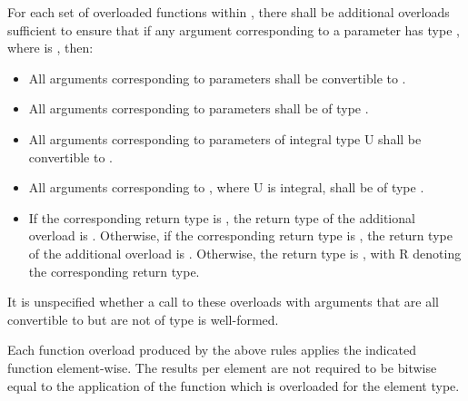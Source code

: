 \pnum \label{cl:cmath-spec} For each set of overloaded functions within , there shall be additional overloads sufficient to ensure that if any argument corresponding to a \double parameter has type \simd[<T, Abi>], where  is \true, then:
\begin{itemize}
  \item All arguments corresponding to \double parameters shall be convertible to \simd[<T, Abi>].

  \item All arguments corresponding to  parameters shall be of type \simd[<T, Abi>*].

  \item All arguments corresponding to parameters of integral type \type U shall be convertible to .

  \item All arguments corresponding to , where \type U is integral, shall be of type .

  \item If the corresponding return type is \double, the return type of the additional overload is \simd[<T, Abi>].
    Otherwise, if the corresponding return type is \bool, the return type of the additional overload is \mask[<T, Abi>].
    Otherwise, the return type is , with \type R denoting the corresponding return type.
\end{itemize}
It is unspecified whether a call to these overloads with arguments that are all convertible to \simd[<T, Abi>] but are not of type \simd[<T, Abi>] is well-formed.

\pnum Each function overload produced by the above rules applies the indicated  function element-wise.
The results per element are not required to be bitwise equal to the application of the function which is overloaded for the element type.


